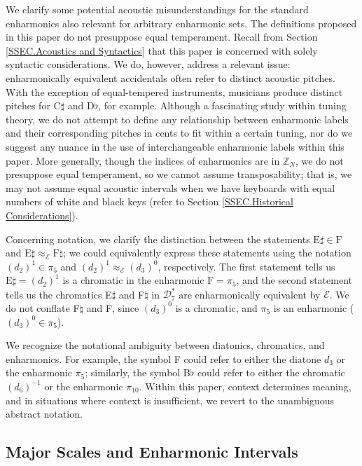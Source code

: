 \documentclass{article}
\theoremstyle{plain}
\theoremstyle{definition}
\theoremstyle{remark}
\begin{document}
We clarify some potential acoustic misunderstandings for the standard enharmonics also relevant for arbitrary enharmonic sets. The definitions proposed in this paper do not presuppose equal temperament. Recall from Section \ref{SSEC.Acoustics and Syntactics} that this paper is concerned with solely syntactic considerations. We do, however, address a relevant issue: enharmonically equivalent accidentals often refer to distinct acoustic pitches. With the exception of equal-tempered instruments, musicians produce distinct pitches for C$\sharp$ and D$\flat$, for example. Although a fascinating study within tuning theory, we do not attempt to define any relationship between enharmonic labels and their corresponding pitches in cents to fit within a certain tuning, nor do we suggest any nuance in the use of interchangeable enharmonic labels within this paper. More generally, though the indices of enharmonics are in $\mathbb{Z}_N$, we do not presuppose equal temperament, so we cannot assume transposability; that is, we may not assume equal acoustic intervals when we have keyboards with equal numbers of white and black keys (refer to Section \ref{SSEC.Historical Considerations}).

Concerning notation, we clarify the distinction between the statements $\textrm{E}\sharp\in\textrm{F}$ and $\textrm{E}\sharp\approx_\mathcal{E}\textrm{F}\natural$; we could equivalently express these statements using the notation $(d_2)^1\in\pi_5$ and $(d_2)^1\approx_\mathcal{E}(d_3)^0$, respectively. The first statement tells us $\textrm{E}\sharp=(d_2)^1$ is a chromatic in the enharmonic $\textrm{F}=\pi_5$, and the second statement tells us the chromatics E$\sharp$ and F$\natural$ in $\mathcal{D}_7^\ast$ are enharmonically equivalent by $\mathcal{E}$. We do not conflate F$\natural$ and F, since $(d_3)^0$ is a chromatic, and $\pi_5$ is an enharmonic ($(d_3)^0\in\pi_5$).

We recognize the notational ambiguity between diatonics, chromatics, and enharmonics. For example, the symbol F could refer to either the diatone $d_3$ or the enharmonic $\pi_5$; similarly, the symbol B$\flat$ could refer to either the chromatic $(d_6)^{-1}$ or the enharmonic $\pi_{10}$. Within this paper, context determines meaning, and in situations where context is insufficient, we revert to the unambiguous abstract notation.

\subsection{Major Scales and Enharmonic Intervals}
\label{SSEC.Major Scales and Enharmonic Intervals}
\end{document}
